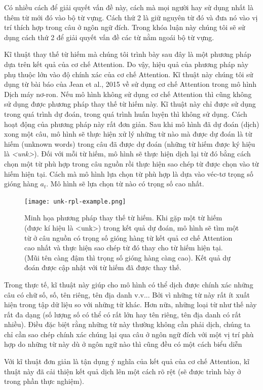 Có nhiều cách để giải quyết vấn đề này, cách mà mọi người hay sử dụng nhất là thêm từ mới đó vào bộ từ vựng. Cách thứ 2 là giữ nguyên từ đó và đưa nó vào vị trí thích hợp trong câu ở ngôn ngữ đích. Trong khóa luận này chúng tôi sẽ sử dụng cách thứ 2 để giải quyết vấn đề các từ nằm ngoái bộ từ vựng.

Kĩ thuật thay thế từ hiếm mà chúng tôi trình bày sau đây là một phương pháp dựa trên kết quả của cơ chế Attention. Do vậy, hiệu quả của phương pháp này phụ thuộc lớn vào độ chính xác của cơ chế Attention. Kĩ thuật này chúng tôi sử dụng từ bài báo của Jean et al., 2015 \cite{JeanUnkRepl} về sử dụng cơ chế Attention trong mô hình Dịch máy nơ-ron. Nếu mô hình không sử dụng cơ chế Attention thì cũng không sử dụng được phương pháp thay thế từ hiếm này. Kĩ thuật này chỉ được sử dụng trong quá trình dự đoán, trong quá trình huấn luyện thì không sử dụng. Cách hoạt động của phương pháp này rất đơn giản. Sau khi mô hình đã dự đoán (dịch) xong một câu, mô hình sẽ thực hiện xử lý những từ nào mà được dự đoán là từ hiếm (unknown words) trong câu đã được dự đoán (những từ hiếm được ký hiệu là \textit{<unk>}). Đối với mỗi từ hiếm, mô hình sẽ thực hiện dịch lại từ đó bằng cách chọn một từ phù hợp trong câu nguồn rồi thực hiện sao chép từ được chọn vào từ hiếm hiện tại. Cách mà mô hình lựa chọn từ phù hợp là dựa vào véc-tơ trọng số gióng hàng $a_t$. Mô hình sẽ lựa chọn từ nào có trọng số cao nhất.

\begin{figure}
	\centering
	\texttt{[image: unk-rpl-example.png]}
	\caption[Minh họa kĩ thuật thay thế từ hiếm.]{Minh họa phương pháp thay thế từ hiếm. Khi gặp một từ hiếm (được kí hiệu là <unk>) trong kết quả dự đoán, mô hình sẽ tìm một từ ở câu nguồn có trọng số gióng hàng từ kết quả cơ chế Attention cao nhất và thực hiện sao chép từ đó thay cho từ hiếm hiện tại. (Mũi tên càng đậm thì trọng số gióng hàng càng cao). Kết quả dự đoán được cập nhật với từ hiếm đã được thay thế. }
	\label{fig_unk_rpl_example}
\end{figure}
Trong thực tế, kĩ thuật này giúp cho mô hình có thể dịch được chính xác những câu có chữ số, số, tên riêng, tên địa danh v.v... Bởi vì những từ này rất ít xuất hiện trong tập dữ liệu so với những từ khác. Hơn nữa, những loại từ như thế này rất đa dạng (số lượng số có thể có rất lớn hay tên riêng, tên địa danh có rất nhiều). Điều đặc biệt rằng những từ này thường không cần phải dịch, chúng ta chỉ cần sao chép chính xác chúng lại qua câu ở ngôn ngữ đích với một vị trí phù hợp do những từ này dù ở ngôn ngữ nào thì cũng đều có một cách biểu diễn 

Với kĩ thuật đơn giản là tận dụng ý nghĩa của kết quả của cơ chế Attention, kĩ thuật này đã cải thiện kết quả dịch lên một cách rõ rệt (sẽ được trình bày ở trong phần thực nghiệm).


